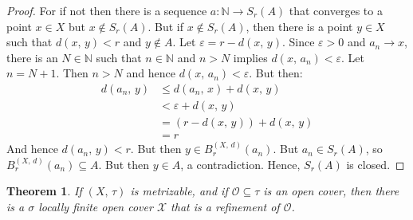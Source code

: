 \documentclass{article}
\theoremstyle{plain}
\newtheorem{theorem}{Theorem}[section]
\theoremstyle{normal}
\begin{document}
        \begin{proof}
            For if not then there is a sequence
            $a:\mathbb{N}\rightarrow{S}_{r}(A)$ that converges to a
            point $x\in{X}$ but $x\notin{S}_{r}(A)$. But if
            $x\notin{S}_{r}(A)$, then there is a point $y\in{X}$ such that
            $d(x,\,y)<r$ and $y\notin{A}$. Let $\varepsilon=r-d(x,\,y)$. Since
            $\varepsilon>0$ and $a_{n}\rightarrow{x}$, there is an
            $N\in\mathbb{N}$ such that $n\in\mathbb{N}$ and $n>N$ implies
            $d(x,\,a_{n})<\varepsilon$. Let $n=N+1$. Then $n>N$ and hence
            $d(x,\,a_{n})<\varepsilon$. But then:
            \begin{align}
                d(a_{n},\,y)
                    &\leq{d}(a_{n},\,x)+d(x,\,y)\\
                    &<\varepsilon+d(x,\,y)\\
                    &=(r-d(x,\,y))+d(x,\,y)\\
                    &=r
            \end{align}
            And hence $d(a_{n},\,y)<r$. But then $y\in{B}_{r}^{(X,\,d)}(a_{n})$.
            But $a_{n}\in{S}_{r}(A)$, so $B_{r}^{(X,\,d)}(a_{n})\subseteq{A}$.
            But then $y\in{A}$, a contradiction. Hence, $S_{r}(A)$ is closed.
        \end{proof}
        \begin{theorem}
            If $(X,\,\tau)$ is metrizable, and if $\mathcal{O}\subseteq\tau$ is
            an open cover, then there is a $\sigma$ locally finite open cover
            $\mathcal{X}$ that is a refinement of $\mathcal{O}$.
        \end{theorem}
\end{document}
